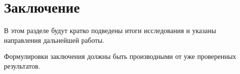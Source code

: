 \section{Заключение}

В этом разделе будут кратко подведены итоги исследования и указаны направления дальнейшей работы.

Формулировки заключения должны быть производными от уже проверенных результатов.
